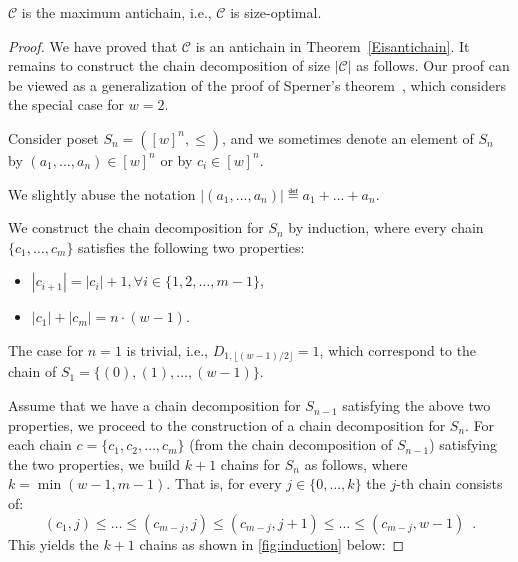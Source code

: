 \begin{theorem}\label{maximum-antichain}
    $\mathcal{C}$ is the maximum antichain, i.e., $\mathcal{C}$ is size-optimal.
\end{theorem}


\begin{proof}
    We have proved that $\mathcal{C}$ is an antichain in Theorem~\ref{Eisantichain}. It remains to construct the chain decomposition of size $|\mathcal{C}|$ as follows. Our proof can be viewed as a generalization of the proof of Sperner's theorem~\cite{sperner1928satz}, which considers the special case for $w=2$.  
    
    Consider poset $S_n=([w]^n,\leq)$, and we sometimes denote an element of $ S_n $ by $(a_1, ..., a_n)\in [w]^n$ or by $c_i\in [w]^n$.  We slightly abuse the notation $|(a_1, ..., a_n)| \eqdef a_1 + ... + a_n$.
    
    We construct the chain decomposition for $S_n$ by induction, where every chain $\{c_1,\ldots, c_{m}\}$ satisfies the following two properties:
    \begin{itemize}
        \item $|c_{i+1}| = |c_i| + 1, \forall i \in \{1,2,\dots,m-1\}$,
        \item $|c_1| + |c_{m}| = n \cdot (w-1)$.
    \end{itemize}
    
    The case for $n=1$ is trivial, i.e., $D_{1, \lfloor{(w-1)/2}\rfloor} = 1$, which correspond to the  chain of $S_1=\{(0), (1), \ldots,  (w-1)\}$. %
    
Assume that we have a chain decomposition for $S_{n-1}$ satisfying the above two properties, we proceed to the construction of a chain decomposition for $S_{n}$. For each chain $c=\{c_{1}, c_{2}, \ldots, c_{m}\}$ (from the chain decomposition of $S_{n-1}$) satisfying the two properties, we build $k+1$ chains for  $S_{n}$ as follows, where $k = \min(w-1, m - 1)$. 
That is, for every $j\in\{0,...,k\}$ the $j$-th chain  consists of:
$$ (c_{1}, j) \le \ldots \le (c_{m - j}, j) \le (c_{m - j}, j+1) \le ... \le (c_{m - j}, w-1) \enspace .$$
This yields the  $k+1$ chains
as shown in \cref{fig:induction} below:
       

\end{proof}
